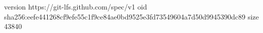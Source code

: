 version https://git-lfs.github.com/spec/v1
oid sha256:eefe441268cf9efe55c1f9ce84ae0bd9525e3fd73549604a7d50d9945390dc89
size 43840
